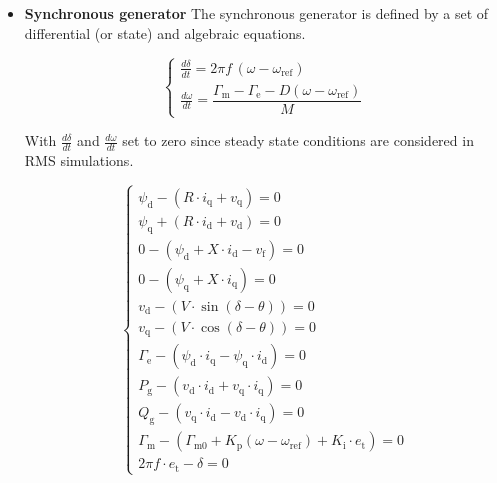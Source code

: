 \begin{itemize}
Where:
\begin{itemize}
  \item $P_{\text{sh}}$: (Algebraic variable) Active power injected or absorbed by the shunt [p.u.].
  \item $Q_{\text{sh}}$: (Algebraic variable) Reactive power injected or absorbed by the shunt [p.u.].
  \item $g$: (Constant parameter) Shunt conductance [p.u.].
  \item $b$: (Constant parameter) Shunt susceptance [p.u.].
  \item $V$: (Constant parameter) Shunt voltage [p.u.].
\end{itemize}

\item \textbf{Synchronous generator}
The synchronous generator is defined by a set of differential (or state) and algebraic equations. 


\begin{equation}
\begin{cases}
\frac{d\delta}{dt} = 2\pi f\,(\omega - \omega_{\text{ref}}) \\
\frac{d\omega}{dt} = \dfrac{\Gamma_\text{m} - \Gamma_\text{e} - D(\omega - \omega_{\text{ref}})}{M}
\end{cases}
\label{eq:diff_eq_gen_1}
\end{equation}

With $\frac{d\delta}{dt}$ and $\frac{d\omega}{dt}$ set to zero since steady state conditions are considered in RMS simulations.


\begin{equation}
\begin{cases}
\psi_\text{d} - (R \cdot i_\text{q} + v_\text{q}) = 0 \\
\psi_\text{q} + (R\cdot i_\text{d} + v_\text{d}) = 0\\
0 - ( \psi_\text{d} + X \cdot i_\text{d} - v_\text{f} ) = 0\\
0 - (\psi_\text{q} + X \cdot i_\text{q}) = 0 \\
v_\text{d} - (V \cdot \sin(\delta - \theta)) = 0\\
v_\text{q} - (V \cdot \cos(\delta - \theta)) = 0\\
\Gamma_\text{e} - ( \psi_\text{d} \cdot i_\text{q} - \psi_\text{q} \cdot i_\text{d} ) = 0\\
P_\text{g} - (v_\text{d} \cdot i_\text{d} + v_\text{q} \cdot i_\text{q}) = 0\\
Q_\text{g} - (v_\text{q} \cdot i_\text{d} - v_\text{d} \cdot i_\text{q}) = 0 \\
\Gamma_\text{m} - (\Gamma_{\text{m0}} + K_\text{p}(\omega - \omega_{\text{ref}}) + K_\text{i} \cdot e_\text{t}) = 0\\
2\pi f \cdot e_\text{t} - \delta = 0
\end{cases}
\label{eq:alg_eq_gen}
\end{equation}


\end{itemize}
